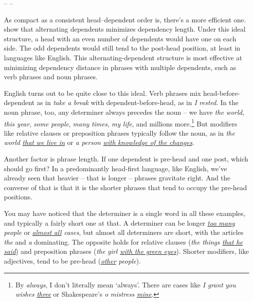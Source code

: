 \begin{center}
-- --
\end{center}

\noindent As compact as a consistent head–dependent order is, 
there's a more efficient one. \citet{Gildea2007} show that alternating dependents minimizes dependency length. Under this ideal structure, a head with an even number of dependents would have one on each side. The odd dependents would still tend to the post-head position, at least in languages like English. This alternating-dependent structure is most effective at minimizing dependency distance in phrases with multiple dependents, such as verb phrases and noun phrases.

English turns out to be quite close to this ideal. Verb phrases mix head-before-dependent as in \textit{take a break} with dependent-before-head, as in \textit{I rested}. In the noun phrase, too, any determiner always precedes the noun -- we have \textit{the world}, \textit{this year}, \textit{some people}, \textit{many times}, \textit{my life}, and millions more.\footnote{By \textit{always}, I don't literally mean `always'. There are cases like \textit{I grant you wishes \uline{three}} or Shakespeare's \textit{o mistress \uline{mine}}.} But modifiers like relative clauses or preposition phrases typically follow the noun, as in \textit{the world \uline{that we live in}} or \textit{a person \uline{with knowledge of the changes}}.

Another factor is phrase length. If one dependent is pre-head and one post, which should go first? In a predominantly head-first language, like English, we've already seen that heavier -- that is longer -- phrases gravitate right. And the converse of that is that it is the shorter phrases that tend to occupy the pre-head positions.

You may have noticed that the determiner is a single word in all these examples, and typically a fairly short one at that. A determiner can be longer \textit{\uline{too many} people} or \textit{\uline{almost all} cases}, but almost all determiners are short, with the articles \textit{the} and \textit{a} dominating. The opposite holds for relative clauses (\textit{the things \uline{that he said}}) and preposition phrases (\textit{the girl \uline{with the green eyes}}). Shorter modifiers, like adjectives, tend to be pre-head (\textit{\uline{other} people}).



